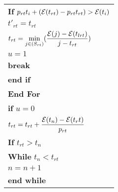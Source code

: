\begin{table}
\begin{minipage}[b]{8cm}
\begin{tabular}{p{7cm}}
\hspace{7mm}\textbf{If} $p_{rt}t_i + (\mathcal{E}(t_{rt}) - p_{rt}t_{rt}) > \mathcal{E}(t_i)$
\\
\hspace{10mm}$t'_{rt} = t_{rt}$
\\
\hspace{10mm}$t_{rt} = \displaystyle \min_{j\in(S_{rt})}(\dfrac{\mathcal{E}(j)-\mathcal{E}(t_{lrt})}{j-t_{rt}})$
\\
\hspace{10mm}$u=1$
\\
\hspace{10mm}\textbf{break}
\\
\hspace{7mm}\textbf{end if}
\\
\hspace{4mm}\textbf{End For}
\\
\hspace{4mm}\textbf{if} $u=0$
\\
\hspace{7mm} $t_{rt} = t_{rt} + \dfrac{\mathcal{E}(t_n)-\mathcal{E}(t_rt)}{p_{rt}}$
\\
\hspace{7mm}\textbf{If} $t_{rt}>t_{n}$
\\
\hspace{10mm}\textbf{While} $t_n < t_{rt}$
\\
\hspace{13mm} $n=n+1$
\\
\hspace{10mm} \textbf{end while}
\\

\end{tabular}
\end{minipage}
\end{table}
